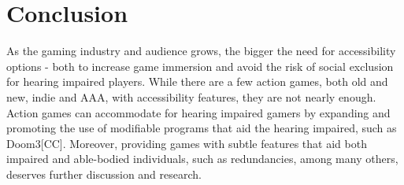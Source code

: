 \documentclass{scrartcl}
\begin{document}
\section{Conclusion}

As the gaming industry and audience grows, the bigger the need for accessibility options - both to increase game immersion and avoid the risk of social exclusion for hearing impaired players. While there are a few action games, both old and new, indie and AAA, with accessibility features, they are not nearly enough. Action games can accommodate for hearing impaired gamers by expanding and promoting the use of modifiable programs that aid the hearing impaired, such as Doom3[CC]. Moreover, providing games with subtle features that aid both impaired and able-bodied individuals, such as redundancies, among many others, deserves further discussion and research.



\end{document}
